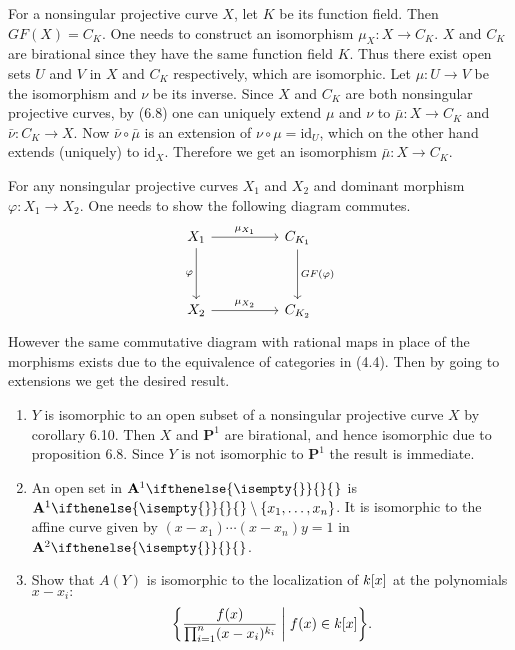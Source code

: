 \documentclass{note}
\newcommand{\Affine}[2][]{\mathbf{A}^{#2}\ifthenelse{\isempty{#1}}{}{_{#1}}}
\newcommand{\Proj}[1]{\mathbf{P}^{#1}}
\newcommand{\id}{\mathrm{id}}
\begin{document}
For a nonsingular projective curve $X$, let $K$ be its function field. Then
$GF(X) = C_K$. One needs to construct an isomorphism $\mu_X\colon X\to C_K$.
$X$ and $C_K$ are birational since they have the same function field $K$. Thus
there exist open sets $U$ and $V$ in $X$ and $C_K$ respectively, which are
isomorphic. Let $\mu\colon U\to V$ be the isomorphism and $\nu$ be its inverse.
Since $X$ and $C_K$ are both nonsingular projective curves, by (6.8) one can
uniquely extend $\mu$ and $\nu$ to $\bar\mu\colon X\to C_K$ and $\bar\nu\colon
  C_K\to X$. Now $\bar\nu\circ\bar\mu$ is an extension of $\nu\circ\mu = \id_U$,
which on the other hand extends (uniquely) to $\id_X$. Therefore we get an
isomorphism $\bar\mu\colon X\to C_K$.

For any nonsingular projective curves $X_1$ and $X_2$ and dominant morphism
$\varphi\colon X_1\to X_2$. One needs to show the following diagram commutes.
\begin{equation*}
  \begin{tikzcd}[row sep=huge,column sep=huge]
    X_1 \arrow{r}{\mu_{X_1}} \arrow[swap]{d}{\varphi} & C_{K_1}
    \arrow{d}{GF(\varphi)} \\ X_2 \arrow{r}{\mu_{X_2}} & C_{K_2}
  \end{tikzcd}
\end{equation*}
However the same commutative diagram with rational maps in place of the
morphisms exists due to the equivalence of categories in (4.4). Then by going
to extensions we get the desired result.


\Ex
\begin{enumerate}
  \item $Y$ is isomorphic to an open subset of a nonsingular projective
        curve $X$ by corollary 6.10. Then $X$ and $\Proj1$ are birational, and hence
        isomorphic due to proposition 6.8. Since $Y$ is not isomorphic to $\Proj1$ the
        result is immediate.
  \item An open set in $\Affine1$ is $\Affine1\setminus\set{x_1}{\dots}{x_n}$. It is
        isomorphic to the affine curve given by $(x-x_1)\cdots(x-x_n)y=1$ in
        $\Affine2$.
  \item Show that $A(Y)$ is isomorphic to the localization of $\polynomials{k}{x}$ at
        the polynomials $x-x_i\colon$
        \begin{equation*}
          \set{\frac{f(x)}{\prod_{i=1}^n(x-x_i)^{k_i}} \biggm\vert
            f(x) \in \polynomials{k}{x}}.
        \end{equation*}
\end{enumerate}
\end{document}
